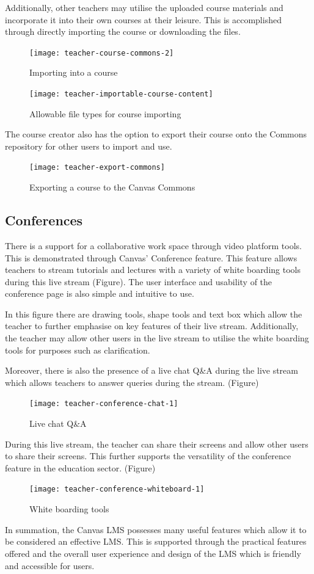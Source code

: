 Additionally, other teachers may utilise the uploaded course materials and incorporate it into their own courses at their leisure. This is accomplished through directly importing the course or downloading the files.

\begin{figure}
\centering
\texttt{[image: teacher-course-commons-2]}
\caption{Importing into a course}
\end{figure}

\begin{figure}
\centering
\texttt{[image: teacher-importable-course-content]}
\caption{Allowable file types for course importing}
\end{figure}

The course creator also has the option to export their course onto the Commons repository for other users to import and use. 

\begin{figure}
\centering
\texttt{[image: teacher-export-commons]}
\caption{Exporting a course to the Canvas Commons}
\end{figure}

\subsection{Conferences}
There is a support for a collaborative work space through video platform tools. This is demonstrated through Canvas’ Conference feature. This feature allows teachers to stream tutorials and lectures with a variety of white boarding tools during this live stream (Figure). The user interface and usability of the conference page is also simple and intuitive to use.

In this figure there are drawing tools, shape tools and text box which allow the teacher to further emphasise on key features of their live stream. Additionally, the teacher may allow other users in the live stream to utilise the white boarding tools for purposes such as clarification. 

Moreover, there is also the presence of a live chat Q&A during the live stream which allows teachers to answer queries during the stream. (Figure)

\begin{figure}
\centering
\texttt{[image: teacher-conference-chat-1]}
\caption{Live chat Q&A}
\end{figure}

During this live stream, the teacher can share their screens and allow other users to share their screens. This further supports the versatility of the conference feature in the education sector. (Figure)

\begin{figure}
\centering
\texttt{[image: teacher-conference-whiteboard-1]}
\caption{White boarding tools}
\end{figure}

In summation, the Canvas LMS possesses many useful features which allow it to be considered an effective LMS. This is supported through the practical features offered and the overall user experience and design of the LMS which is friendly and accessible for users. 
